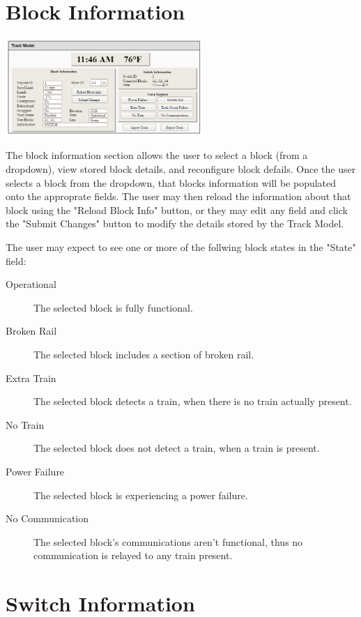 \documentclass{scrreprt}
\begin{document}
\section{Block Information}

\begin{center}
    \includegraphics[trim={.5cm .5cm 11cm 3.6cm},clip,width=7.5cm]{track-model}
\end{center}

The block information section allows the user to select a block (from a dropdown), view
stored block details, and reconfigure block defails. Once the user selects a block from the
dropdown, that blocks information will be populated onto the approprate fields. The user may
then reload the information about that block using the "Reload Block Info" button, or they
may edit any field and click the "Submit Changes" button to modify the details stored by
the Track Model.

The user may expect to see one or more of the follwing block states in the "State" field:
\begin{description}
    \item[Operational] The selected block is fully functional.
    \item[Broken Rail] The selected block includes a section of broken rail.
    \item[Extra Train] The selected block detects a train, when there is no train 
        actually present.
    \item[No Train] The selected block does not detect a train, when a train is present.
    \item[Power Failure] The selected block is experiencing a power failure.
    \item[No Communication] The selected block's communications aren't functional, thus no
        communication is relayed to any train present.
\end{description}

\section{Switch Information}
\end{document}
